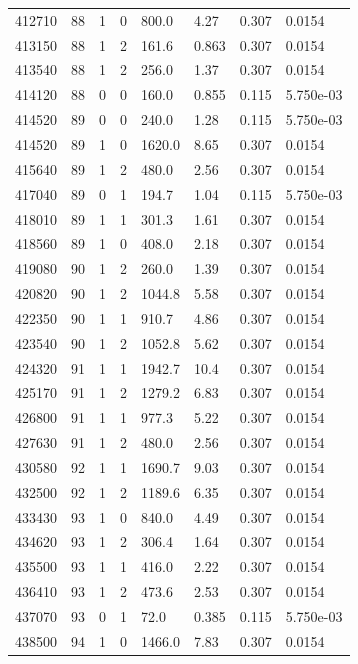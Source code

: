 \documentclass[preview]{standalone}
\begin{document}
{{{{{{{{{{{\begin{tabular}{L{1.2cm}C{1.2cm} C{0.3cm}C{0.5cm} C{1.4cm}C{1.4cm} C{1.4cm}C{1.4cm}}
  412710  &    88  & 1     &  0 &  800.0  & 4.27  & 0.307 &  0.0154   \\ 
  413150  &    88  & 1     &  2 &  161.6  & 0.863  & 0.307 &  0.0154   \\ 
  413540  &    88  & 1     &  2 &  256.0  & 1.37  & 0.307 &  0.0154   \\ 
  414120  &    88  & 0     &  0 &  160.0  & 0.855  & 0.115 &  5.750e-03   \\ 
  414520  &    89  & 0     &  0 &  240.0  & 1.28  & 0.115 &  5.750e-03   \\ 
  414520  &    89  & 1     &  0 &  1620.0  & 8.65  & 0.307 &  0.0154   \\ 
  415640  &    89  & 1     &  2 &  480.0  & 2.56  & 0.307 &  0.0154   \\ 
  417040  &    89  & 0     &  1 &  194.7  & 1.04  & 0.115 &  5.750e-03   \\ 
  418010  &    89  & 1     &  1 &  301.3  & 1.61  & 0.307 &  0.0154   \\ 
  418560  &    89  & 1     &  0 &  408.0  & 2.18  & 0.307 &  0.0154   \\ 
  419080  &    90  & 1     &  2 &  260.0  & 1.39  & 0.307 &  0.0154   \\ 
  420820  &    90  & 1     &  2 &  1044.8  & 5.58  & 0.307 &  0.0154   \\ 
  422350  &    90  & 1     &  1 &  910.7  & 4.86  & 0.307 &  0.0154   \\ 
  423540  &    90  & 1     &  2 &  1052.8  & 5.62  & 0.307 &  0.0154   \\ 
  424320  &    91  & 1     &  1 &  1942.7  & 10.4  & 0.307 &  0.0154   \\ 
  425170  &    91  & 1     &  2 &  1279.2  & 6.83  & 0.307 &  0.0154   \\ 
  426800  &    91  & 1     &  1 &  977.3  & 5.22  & 0.307 &  0.0154   \\ 
  427630  &    91  & 1     &  2 &  480.0  & 2.56  & 0.307 &  0.0154   \\ 
  430580  &    92  & 1     &  1 &  1690.7  & 9.03  & 0.307 &  0.0154   \\ 
  432500  &    92  & 1     &  2 &  1189.6  & 6.35  & 0.307 &  0.0154   \\ 
  433430  &    93  & 1     &  0 &  840.0  & 4.49  & 0.307 &  0.0154   \\ 
  434620  &    93  & 1     &  2 &  306.4  & 1.64  & 0.307 &  0.0154   \\ 
  435500  &    93  & 1     &  1 &  416.0  & 2.22  & 0.307 &  0.0154   \\ 
  436410  &    93  & 1     &  2 &  473.6  & 2.53  & 0.307 &  0.0154   \\ 
  437070  &    93  & 0     &  1 &  72.0  & 0.385  & 0.115 &  5.750e-03   \\ 
  438500  &    94  & 1     &  0 &  1466.0  & 7.83  & 0.307 &  0.0154   \\ 
\hline 
\end{tabular} 

}}}}}}}}}}}
\end{document}
